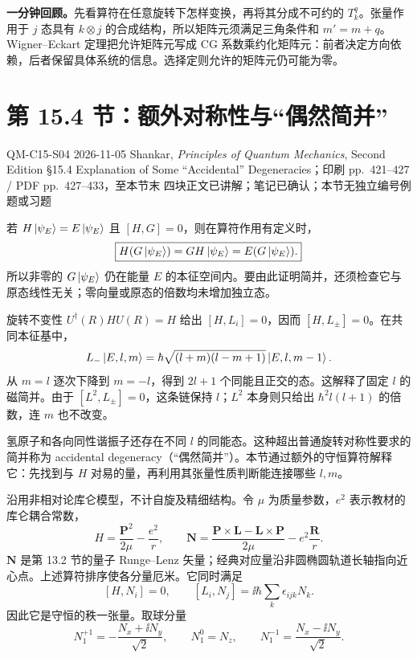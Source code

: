 \textbf{一分钟回顾。}先看算符在任意旋转下怎样变换，再将其分成不可约的 $T_k^q$。张量作用于 $j$ 态具有 $k\otimes j$ 的合成结构，所以矩阵元须满足三角条件和 $m'=m+q$。Wigner--Eckart 定理把允许矩阵元写成 CG 系数乘约化矩阵元：前者决定方向依赖，后者保留具体系统的信息。选择定则允许的矩阵元仍可能为零。

\section{第 15.4 节：额外对称性与“偶然简并”}
\label{section:QM-C15-S04}
\studymeta
  {QM-C15-S04}
  {2026-11-05}
  {Shankar, \textit{Principles of Quantum Mechanics}, Second Edition}
  {\S 15.4 Explanation of Some ``Accidental'' Degeneracies；印刷 pp.~421--427 / PDF pp.~427--433，至本节末}
  {四块正文已讲解；笔记已确认；本节无独立编号例题或习题}


若 $H\left|\psi_E\right\rangle=E\left|\psi_E\right\rangle$ 且 $[H,G]=0$，则在算符作用有定义时，
\begin{equation}
  \boxed{H(G\left|\psi_E\right\rangle)=GH\left|\psi_E\right\rangle=E(G\left|\psi_E\right\rangle).}
\end{equation}
所以非零的 $G\left|\psi_E\right\rangle$ 仍在能量 $E$ 的本征空间内。要由此证明简并，还须检查它与原态线性无关；零向量或原态的倍数均未增加独立态。

旋转不变性 $U^\dagger(R)HU(R)=H$ 给出 $[H,L_i]=0$，因而 $[H,L_\pm]=0$。在共同本征基中，
\begin{equation}
  L_-\left|E,l,m\right\rangle
    =\hbar\sqrt{(l+m)(l-m+1)}\left|E,l,m-1\right\rangle.
\end{equation}
从 $m=l$ 逐次下降到 $m=-l$，得到 $2l+1$ 个同能且正交的态。这解释了固定 $l$ 的磁简并。由于 $[L^2,L_\pm]=0$，这条链保持 $l$；$L^2$ 本身则只给出 $\hbar^2l(l+1)$ 的倍数，连 $m$ 也不改变。

氢原子和各向同性谐振子还存在不同 $l$ 的同能态。这种超出普通旋转对称性要求的简并称为 accidental degeneracy（“偶然简并”）。本节通过额外的守恒算符解释它：先找到与 $H$ 对易的量，再利用其张量性质判断能连接哪些 $l,m$。

沿用非相对论库仑模型，不计自旋及精细结构。令 $\mu$ 为质量参数，$e^2$ 表示教材的库仑耦合常数，
\begin{equation}
  H=\frac{\mathbf P^2}{2\mu}-\frac{e^2}{r},\qquad
  \boxed{\mathbf N=\frac{\mathbf P\times\mathbf L-\mathbf L\times\mathbf P}{2\mu}
       -e^2\frac{\mathbf R}{r}.}
\end{equation}
$\mathbf N$ 是第 13.2 节的量子 Runge--Lenz 矢量；经典对应量沿非圆椭圆轨道长轴指向近心点。上述算符排序使各分量厄米。它同时满足
\begin{equation}
  \boxed{[H,N_i]=0,\qquad [L_i,N_j]=\ii\hbar\sum_k\epsilon_{ijk}N_k.}
\end{equation}
因此它是守恒的秩一张量。取球分量
\begin{equation}
  N_1^{+1}=-\frac{N_x+\ii N_y}{\sqrt2},\qquad
  N_1^0=N_z,\qquad N_1^{-1}=\frac{N_x-\ii N_y}{\sqrt2}.
\end{equation}

